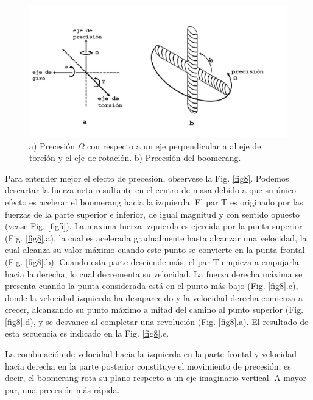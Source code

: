 		\begin{figure}[ht]
		\begin{center}
		\includegraphics[scale=0.25]{imagenes/3-boomerang/precesionAlrededorDeOmega.png}
		\caption{a) Precesión $\Omega$ con respecto a un eje perpendicular a al eje de torción y el eje de rotación. b) Precesión del boomerang.}
		\label{fig7}
		\end{center}
		\end{figure}

	Para entender mejor el efecto de precesión, observese la Fig. \ref{fig8}. Podemos descartar la fuerza neta resultante en el centro de masa debido a que su único efecto es acelerar el boomerang hacia la izquierda. El par T es originado por las fuerzas de la parte superior e inferior, de igual magnitud y con sentido opuesto (vease Fig. \ref{fig5}). La maxima fuerza izquierda es ejercida por la punta superior (Fig. \ref{fig8}.a), la cual es acelerada gradualmente hasta alcanzar una velocidad, la cual alcanza su valor máximo cuando este punto se convierte en la punta frontal (Fig. \ref{fig8}.b). Cuando esta parte desciende más, el par T empieza a empujarla hacia la derecha, lo cual decrementa su velocidad. La fuerza derecha máxima se presenta cuando la punta considerada está en el punto más bajo (Fig. \ref{fig8}.c), donde la velocidad izquierda ha desaparecido y la velocidad derecha comienza a crecer, alcanzando su punto máximo a mitad del camino al punto superior (Fig. \ref{fig8}.d), y se desvanec al completar una revolución (Fig. \ref{fig8}.a). El resultado de esta secuencia es indicado en la Fig. \ref{fig8}.e.


	La combinación de velocidad hacia la izquierda en la parte frontal y velocidad hacia derecha en la parte posterior constituye el movimiento de precesión, es decir, el boomerang rota su plano respecto a un eje imaginario vertical. A mayor par, una precesión más rápida.

